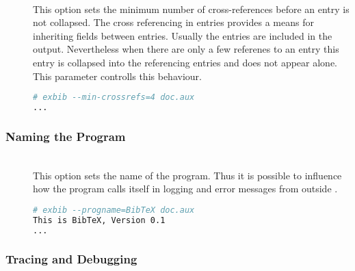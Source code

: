 \begin{description}
\item[ ]
\item[ ]
\item[ ] \ \\
  This option sets the minimum number of cross-references before an
  entry is not collapsed. The cross referencing in entries provides a
  means for inheriting fields between entries. Usually the entries are
  included in the output.  Nevertheless when there are only a few
  referenes to an entry this entry is collapsed into the referencing
  entries and does not appear alone. This parameter controlls this
  behaviour.
\begin{lstlisting}[language=sh]
# exbib --min-crossrefs=4 doc.aux
...
\end{lstlisting}

\end{description}

\subsubsection{Naming the Program}

\begin{description}
\item[ ]
\item[ ]
\item[ ]
\item[ ]\ \\
  This option sets the name of the program. Thus it is possible to
  influence how the program calls itself in logging and error messages
  from outside .
\begin{lstlisting}[language=sh]
# exbib --progname=BibTeX doc.aux
This is BibTeX, Version 0.1
...
\end{lstlisting}

\end{description}


\subsubsection{Tracing and Debugging}%
\label{sec:cli.debug}

